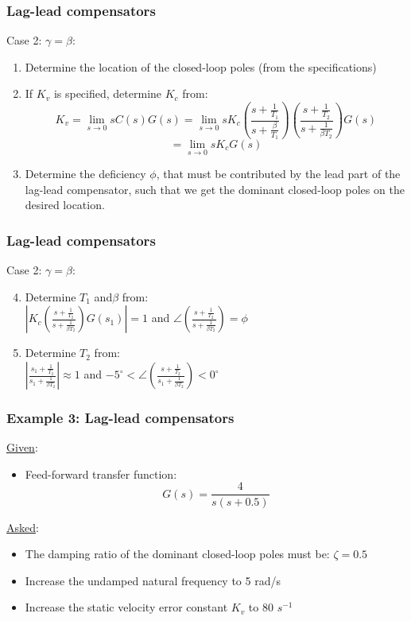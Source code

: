 \begin{frame}
	\frametitle{Lag-lead compensators}
	Case 2: $\gamma= \beta$:
	\begin{enumerate}
		\item Determine the location of the closed-loop poles (from the specifications)
		\item If $K_v$ is specified, determine $K_c$ from:\\
		$$K_v=\lim_{s \to 0} sC(s)G(s)=\lim_{s\to 0}sK_c(\frac{s+\frac{1}{T_1}}{s+\frac{\beta}{T_1}})
		(\frac{s+\frac{1}{T_2}}{s+\frac{1}{\beta T_2}})G(s)$$
		$$=\lim_{s\to0}sK_cG(s)$$\item Determine the deficiency $\phi$, that must be contributed by the lead part of the lag-lead compensator, such that we get the dominant closed-loop poles on the desired location. 
	\end{enumerate}
\end{frame}

\begin{frame}
	\frametitle{Lag-lead compensators}
	Case 2: $\gamma= \beta$:
	\begin{enumerate}
		\setcounter{enumi}{3}
		\item Determine $T_1$ and$\beta$ from:\\
		$|K_c(\frac{s+\frac{1}{T_2}}{s+\frac{1}{\beta T_2}})G(s_1)|=1$ and $\angle(\frac{s+\frac{1}{T_2}}{s+\frac{1}{\beta T_2}})=\phi$
		\item Determine $T_2$ from:\\
		$|\frac{s_1+\frac{1}{T_2}}{s_1+\frac{1}{\beta T_2}}|\approx 1$ and $-5^{\circ}<\angle(\frac{s+\frac{1}{T_2}}{s_1+\frac{1}{\beta T_2}})<0^{\circ}$
	\end{enumerate}
\end{frame}

\begin{frame}
	\frametitle{Example 3: Lag-lead compensators}
	\underline{Given}:
	\begin{itemize}
		\item Feed-forward transfer function: $$G(s)=\frac{4}{s(s+0.5)}$$
	\end{itemize}
	\underline{Asked}:
	\begin{itemize}
		\item The damping ratio of the dominant closed-loop poles must be: $\zeta=0.5$
		\item Increase the undamped natural frequency to 5 rad/s
		\item Increase the static velocity error constant $K_v$ to 80 $s^{-1}$
	\end{itemize}
\end{frame}

